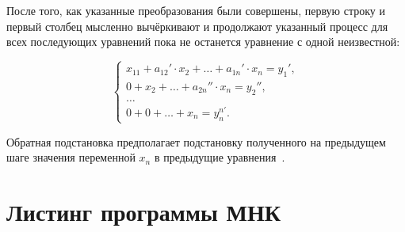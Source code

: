 После того, как указанные преобразования были совершены, первую строку и первый столбец мысленно вычёркивают и продолжают указанный процесс для всех последующих уравнений пока не останется уравнение с одной неизвестной:

\begin{equation}
    \begin{cases}
        x_{11} + a_{12}'\cdot x_2 + \dots + a_{1n}' \cdot x_n = y_1',
        \\
        0 +  x_2 + \dots + a_{2n}'' \cdot x_n = y_2'',
        \\
        \dots
        \\
          0 + 0 + \dots +x_n = y_n^{n'}.
     \end{cases}
\end{equation}

Обратная подстановка предполагает подстановку полученного на предыдущем шаге значения переменной $x_n$ в предыдущие уравнения~\cite{gaus_cpp}.

\section{Листинг программы МНК}

\begin{small}
        
\end{small}
